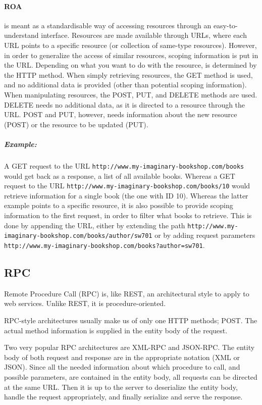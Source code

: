 \paragraph{ROA} is meant as a standardisable way of accessing resources through an easy-to-understand interface.
Resources are made available through URLs, where each URL points to a specific resource (or collection of same-type resources).
However, in order to generalize the access of similar resources, scoping information is put in the URL.
Depending on what you want to do with the resource, is determined by the HTTP method.
When simply retrieving resources, the GET method is used, and no additional data is provided (other than potential scoping information).
When manipulating resources, the POST, PUT, and DELETE methods are used.
DELETE needs no additional data, as it is directed to a resource through the URL.
POST and PUT, however, needs information about the new resource (POST) or the resource to be updated (PUT).
\subparagraph{Example:} A GET request to the URL \texttt{http://www.my-imaginary-bookshop.com/books} would get back as a response, a list of all available books.
Whereas a GET request to the URL \texttt{http://www.my-imaginary-bookshop.com/books/10} would retrieve information for a single book (the one with ID  10).
Whereas the latter example points to a specific resource, it is also possible to provide scoping information to the first request, in order to filter what books to retrieve.
This is done by appending the URL, either by extending the path \texttt{http://www.my-imaginary-bookshop.com/books/author/sw701} or by adding request parameters \texttt{http://www.my-imaginary-bookshop.com/books?author=sw701}.

\subsection{RPC}
Remote Procedure Call (RPC) is, like REST, an architectural style to apply to web services.
Unlike REST, it is procedure-oriented.

RPC-style architectures usually make us of only one HTTP methods; POST.
The actual method information is supplied in the entity body of the request.

Two very popular RPC architectures are XML-RPC and JSON-RPC.
The entity body of both request and response are in the appropriate notation (XML or JSON).
Since all the needed information about which procedure to call, and possible parameters, are contained in the entity body, all requests can be directed at the same URL.
Then it is up to the server to deserialize the entity body, handle the request appropriately, and finally serialize and serve the response.

